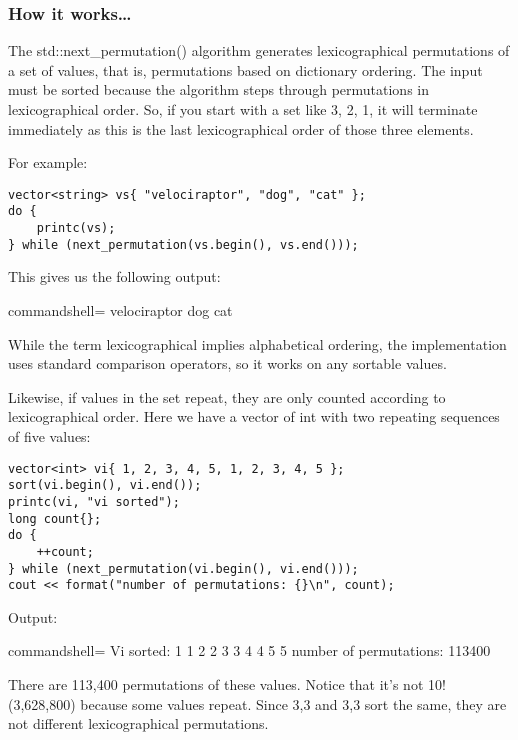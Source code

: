 \subsubsection{How it works…}

The std::next\_permutation() algorithm generates lexicographical permutations of a set of values, that is, permutations based on dictionary ordering. The input must be sorted because the algorithm steps through permutations in lexicographical order. So, if you start with a set like 3, 2, 1, it will terminate immediately as this is the last lexicographical order of those three elements.

For example:

\begin{lstlisting}[style=styleCXX]
vector<string> vs{ "velociraptor", "dog", "cat" };
do {
	printc(vs);
} while (next_permutation(vs.begin(), vs.end()));
\end{lstlisting}

This gives us the following output:

\begin{tcblisting}{commandshell={}}
velociraptor dog cat
\end{tcblisting}

While the term lexicographical implies alphabetical ordering, the implementation uses standard comparison operators, so it works on any sortable values.

Likewise, if values in the set repeat, they are only counted according to lexicographical order. Here we have a vector of int with two repeating sequences of five values:

\begin{lstlisting}[style=styleCXX]
vector<int> vi{ 1, 2, 3, 4, 5, 1, 2, 3, 4, 5 };
sort(vi.begin(), vi.end());
printc(vi, "vi sorted");
long count{};
do {
	++count;
} while (next_permutation(vi.begin(), vi.end()));
cout << format("number of permutations: {}\n", count);
\end{lstlisting}

Output:

\begin{tcblisting}{commandshell={}}
Vi sorted: 1 1 2 2 3 3 4 4 5 5
number of permutations: 113400
\end{tcblisting}

There are 113,400 permutations of these values. Notice that it's not 10! (3,628,800) because some values repeat. Since 3,3 and 3,3 sort the same, they are not different lexicographical permutations.

